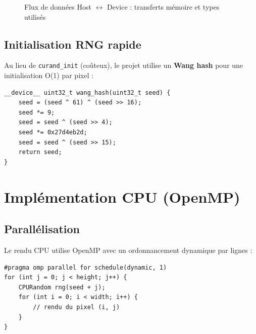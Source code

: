 \documentclass[12pt,a4paper]{article}
\begin{document}
\begin{figure}[H]
\caption{Flux de donn\'ees Host $\leftrightarrow$ Device : transferts m\'emoire et types utilis\'es}
\end{figure}

\subsection{Initialisation RNG rapide}

Au lieu de \texttt{curand\_init} (coûteux), le projet utilise un
\textbf{Wang hash} pour une initialisation O(1) par pixel :

\begin{lstlisting}[caption={Wang hash pour l'initialisation RNG}]
__device__ uint32_t wang_hash(uint32_t seed) {
    seed = (seed ^ 61) ^ (seed >> 16);
    seed *= 9;
    seed = seed ^ (seed >> 4);
    seed *= 0x27d4eb2d;
    seed = seed ^ (seed >> 15);
    return seed;
}
\end{lstlisting}

\section{Implémentation CPU (OpenMP)}

\subsection{Parallélisation}

Le rendu CPU utilise OpenMP avec un ordonnancement dynamique par lignes :

\begin{lstlisting}[caption={Parallélisation OpenMP}]
#pragma omp parallel for schedule(dynamic, 1)
for (int j = 0; j < height; j++) {
    CPURandom rng(seed + j);
    for (int i = 0; i < width; i++) {
        // rendu du pixel (i, j)
    }
}
\end{lstlisting}
\end{document}
